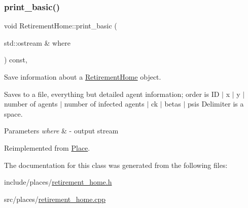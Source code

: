 \subsubsection{\texorpdfstring{print\+\_\+basic()}{print\_basic()}}
{\footnotesize\ttfamily void Retirement\+Home\+::print\+\_\+basic (\begin{DoxyParamCaption}\item[{std\+::ostream \&}]{where }\end{DoxyParamCaption}) const\hspace{0.3cm}{\ttfamily [override]}, {\ttfamily [virtual]}}



Save information about a \hyperlink{classRetirementHome}{Retirement\+Home} object. 

Saves to a file, everything but detailed agent information; order is ID $\vert$ x $\vert$ y $\vert$ number of agents $\vert$ number of infected agents $\vert$ ck $\vert$ betas $\vert$ psis Delimiter is a space. 
\begin{DoxyParams}{Parameters}
{\em where} & -\/ output stream \\
\hline
\end{DoxyParams}


Reimplemented from \hyperlink{classPlace_a9aa7649e0b91c5f61a5f71e9ca808fe1}{Place}.



The documentation for this class was generated from the following files\+:\begin{DoxyCompactItemize}
\item 
include/places/\hyperlink{retirement__home_8h}{retirement\+\_\+home.\+h}\item 
src/places/\hyperlink{retirement__home_8cpp}{retirement\+\_\+home.\+cpp}\end{DoxyCompactItemize}
